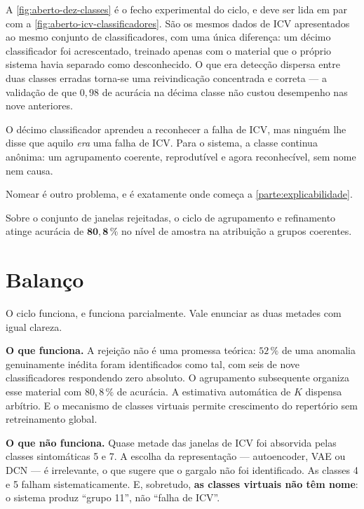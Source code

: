 A \cref{fig:aberto-dez-classes} é o fecho experimental do ciclo, e deve ser lida em par
com a \cref{fig:aberto-icv-classificadores}. São os mesmos dados de ICV apresentados ao
mesmo conjunto de classificadores, com uma única diferença: um décimo classificador foi
acrescentado, treinado apenas com o material que o próprio sistema havia separado como
desconhecido. O que era detecção dispersa entre duas classes erradas torna-se uma
reivindicação concentrada e correta --- a validação de que $0{,}98$ de acurácia na
décima classe não custou desempenho nas nove anteriores.

\begin{destaque}
O décimo classificador aprendeu a reconhecer a falha de ICV, mas ninguém lhe disse que
aquilo \emph{era} uma falha de ICV. Para o sistema, a classe continua anônima: um
agrupamento coerente, reprodutível e agora reconhecível, sem nome nem causa.

Nomear é outro problema, e é exatamente onde começa a \cref{parte:explicabilidade}.
\end{destaque}

\begin{resultadochave}
Sobre o conjunto de janelas rejeitadas, o ciclo de agrupamento e refinamento atinge
acurácia de $\bm{80{,}8\,\%}$ no nível de amostra na atribuição a grupos coerentes.
\end{resultadochave}

\section{Balanço}

O ciclo funciona, e funciona parcialmente. Vale enunciar as duas metades com igual
clareza.

\textbf{O que funciona.} A rejeição não é uma promessa teórica: $52\,\%$ de uma anomalia
genuinamente inédita foram identificados como tal, com seis de nove classificadores
respondendo zero absoluto. O agrupamento subsequente organiza esse material com
$80{,}8\,\%$ de acurácia. A estimativa automática de $K$ dispensa arbítrio. E o
mecanismo de classes virtuais permite crescimento do repertório sem retreinamento
global.

\textbf{O que não funciona.} Quase metade das janelas de ICV foi absorvida pelas classes
sintomáticas 5 e 7. A escolha da representação --- autoencoder, VAE ou DCN --- é
irrelevante, o que sugere que o gargalo não foi identificado. As classes 4 e 5 falham
sistematicamente. E, sobretudo, \textbf{as classes virtuais não têm nome}: o sistema
produz ``grupo 11'', não ``falha de ICV''.

